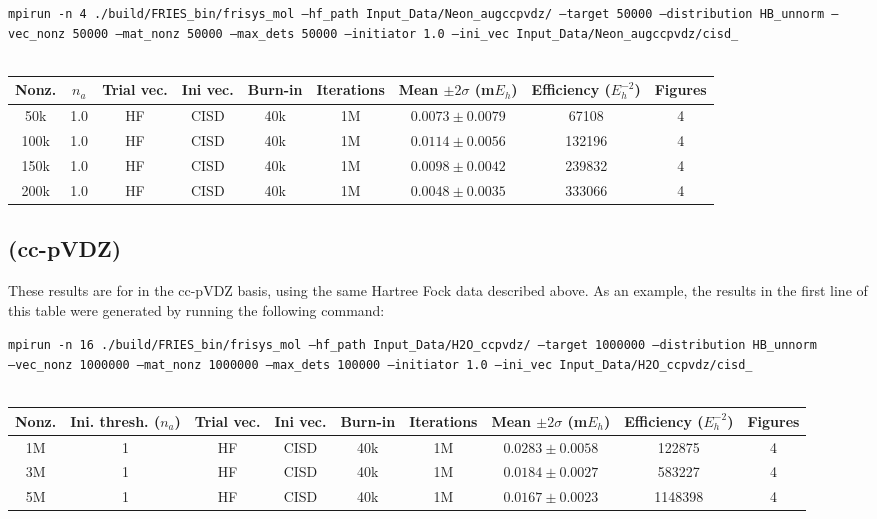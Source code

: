 \documentclass[12pt, landscape]{article}
\begin{document}
\texttt{mpirun -n 4 ./build/FRIES\_bin/frisys\_mol --hf\_path Input\_Data/Neon\_augccpvdz/ --target 50000 --distribution HB\_unnorm --vec\_nonz 50000 --mat\_nonz 50000 --max\_dets 50000 --initiator 1.0 --ini\_vec Input\_Data/Neon\_augccpvdz/cisd\_}
\\~\\
\begin{tabular}{c|c|c|c|c|c|c|c|c}
Nonz. & $n_a$ & Trial vec. & Ini vec. & Burn-in & Iterations & Mean $\pm 2 \sigma$ (m$E_h$) & Efficiency ($E_h^{-2}$) & Figures \\ \hline
50k & 1.0 & HF & CISD & 40k & 1M & $0.0073 \pm 0.0079$ & 67108 & 4 \\
100k & 1.0 & HF & CISD & 40k & 1M & $0.0114 \pm 0.0056$ & 132196 & 4 \\
150k & 1.0 & HF & CISD & 40k & 1M & $0.0098 \pm 0.0042$ & 239832 & 4 \\
200k & 1.0 & HF & CISD & 40k & 1M & $0.0048 \pm 0.0035$ & 333066 & 4 \\
\end{tabular}


\subsection*{ (cc-pVDZ)}
These results are for  in the cc-pVDZ basis, using the same Hartree Fock data described above. As an example, the results in the first line of this table were generated by running the following command:

\texttt{mpirun -n 16 ./build/FRIES\_bin/frisys\_mol --hf\_path Input\_Data/H2O\_ccpvdz/ --target 1000000 --distribution HB\_unnorm}\\ \texttt{--vec\_nonz 1000000 --mat\_nonz 1000000 --max\_dets 100000 --initiator 1.0 --ini\_vec Input\_Data/H2O\_ccpvdz/cisd\_}
\\~\\
\begin{tabular}{c|c|c|c|c|c|c|c|c}
Nonz. & Ini. thresh. ($n_a$) & Trial vec. & Ini vec. & Burn-in & Iterations & Mean $\pm 2 \sigma$ (m$E_h$) & Efficiency ($E_h^{-2}$) & Figures \\ \hline
1M & 1 & HF & CISD & 40k & 1M & $0.0283 \pm 0.0058$ & 122875 & 4\\
3M & 1 & HF & CISD & 40k & 1M & $0.0184 \pm 0.0027$ & 583227 & 4\\
5M & 1 & HF & CISD & 40k & 1M & $0.0167 \pm 0.0023$ & 1148398 & 4\\
\end{tabular}
\end{document}
